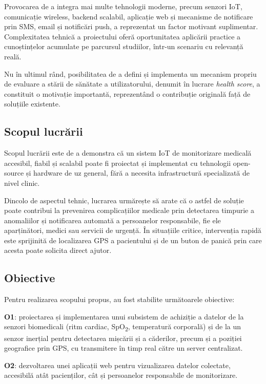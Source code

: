 \documentclass[12pt,a4paper]{article}
\newcommand{\spo}{SpO\textsubscript{2}}
\begin{document}
Provocarea de a integra mai multe tehnologii moderne, precum senzori IoT, comunicație wireless, backend scalabil, aplicație web și mecanisme de notificare prin SMS, email și notificări push, a reprezentat un factor motivant suplimentar. Complexitatea tehnică a proiectului oferă oportunitatea aplicării practice a cunoștințelor acumulate pe parcursul studiilor, într-un scenariu cu relevanță reală.

Nu în ultimul rând, posibilitatea de a defini și implementa un mecanism propriu de evaluare a stării de sănătate a utilizatorului, denumit în lucrare \textit{health score}, a constituit o motivație importantă, reprezentând o contribuție originală față de soluțiile existente.

\subsection{Scopul lucrării}

Scopul lucrării este de a demonstra că un sistem IoT de monitorizare medicală accesibil, fiabil și scalabil poate fi proiectat și implementat cu tehnologii open-source și hardware de uz general, fără a necesita infrastructură specializată de nivel clinic.

Dincolo de aspectul tehnic, lucrarea urmărește să arate că o astfel de soluție poate contribui la prevenirea complicațiilor medicale prin detectarea timpurie a anomaliilor și notificarea automată a persoanelor responsabile, fie ele aparținători, medici sau servicii de urgență. În situațiile critice, intervenția rapidă este sprijinită de localizarea GPS a pacientului și de un buton de panică prin care acesta poate solicita direct ajutor.

\subsection{Obiective}

Pentru realizarea scopului propus, au fost stabilite următoarele obiective:

\textbf{O1}: proiectarea și implementarea unui subsistem de achiziție a datelor de la senzori biomedicali (ritm cardiac, \spo, temperatură corporală) și de la un senzor inerțial pentru detectarea mișcării și a căderilor, precum și a poziției geografice prin GPS, cu transmitere în timp real către un server centralizat.

\textbf{O2}: dezvoltarea unei aplicații web pentru vizualizarea datelor colectate, accesibilă atât pacienților, cât și persoanelor responsabile de monitorizare.
\end{document}
